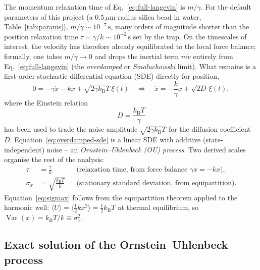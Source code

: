 \documentclass[11pt]{article}
\newcommand{\avg}[1]{\langle #1 \rangle}
\newcommand{\kB}{k_{\mathrm{B}}}
\newcommand{\Var}{\operatorname{Var}}
\begin{document}
The momentum relaxation time of Eq.~\eqref{eq:full-langevin} is $m/\gamma$. For the default parameters of this project (a $0.5\,\mu\mathrm{m}$-radius silica bead in water, Table~\ref{tab:params}), $m/\gamma \sim 10^{-7}\,\mathrm{s}$, many orders of magnitude shorter than the position relaxation time $\tau = \gamma/k \sim 10^{-2}\,\mathrm{s}$ set by the trap. On the timescales of interest, the velocity has therefore already equilibrated to the local force balance; formally, one takes $m/\gamma \to 0$ and drops the inertial term $m\dot v$ entirely from Eq.~\eqref{eq:full-langevin} (the \emph{overdamped} or \emph{Smoluchowski} limit). What remains is a first-order stochastic differential equation (SDE) directly for position,
\begin{equation}
0 = -\gamma \dot x - kx + \sqrt{2\gamma \kB T}\,\xi(t)
\quad\Longrightarrow\quad
\dot x = -\frac{k}{\gamma}x + \sqrt{2D}\,\xi(t),
\label{eq:overdamped-sde}
\end{equation}
where the Einstein relation
\begin{equation}
D = \frac{\kB T}{\gamma}
\label{eq:einstein}
\end{equation}
has been used to trade the noise amplitude $\sqrt{2\gamma \kB T}$ for the diffusion coefficient $D$. Equation~\eqref{eq:overdamped-sde} is a linear SDE with additive (state-independent) noise -- an \emph{Ornstein--Uhlenbeck (OU) process}. Two derived scales organise the rest of the analysis:
\begin{align}
\tau &= \frac{\gamma}{k} &&\text{(relaxation time, from force balance } \gamma\dot x = -kx \text{),}
\label{eq:tau}\\
\sigma_x &= \sqrt{\frac{\kB T}{k}} &&\text{(stationary standard deviation, from equipartition).}
\label{eq:sigmax}
\end{align}
Equation~\eqref{eq:sigmax} follows from the equipartition theorem applied to the harmonic well: $\avg{U} = \avg{\tfrac12 k x^2} = \tfrac12 \kB T$ at thermal equilibrium, so $\Var(x) = \kB T/k \equiv \sigma_x^2$.

\subsection{Exact solution of the Ornstein--Uhlenbeck process}
\label{sec:ou-solution}
\end{document}
